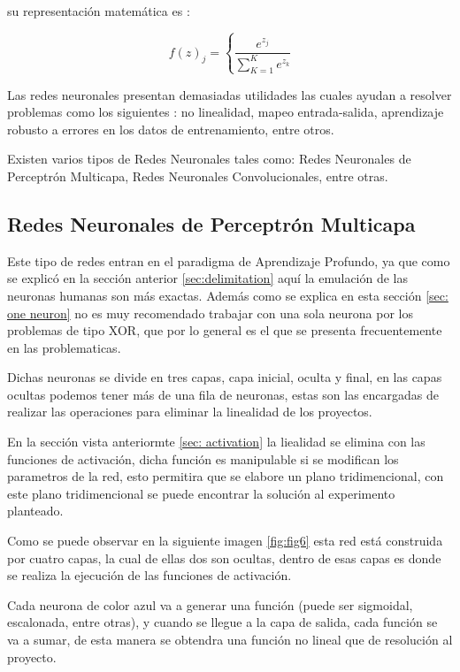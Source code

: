                 su representaci\'on matem\'atica es \cite{calvo-2018}:

                \[f(z)_j = \left\{ \frac{e^{z_j}}{\sum_{K=1}^{K} e^{z_k}} \right. \]

        Las redes neuronales presentan demasiadas utilidades las cuales ayudan a  resolver problemas como los 
        siguientes \cite{liu2015}: no linealidad, mapeo entrada-salida, aprendizaje robusto 
        a errores en los datos de entrenamiento, entre otros.

        Existen varios tipos de Redes Neuronales tales como: Redes Neuronales de Perceptr\'on 
        Multicapa, Redes Neuronales Convolucionales, entre otras.
    
        \subsection{Redes Neuronales de Perceptr\'on Multicapa}
            Este tipo de redes entran en el paradigma de Aprendizaje Profundo, ya que como se explic\'o en 
            la secci\'on anterior \eqref{sec:delimitation} aqu\'i la emulaci\'on de las neuronas humanas son m\'as 
            exactas.
            Adem\'as como se explica en esta sección \eqref{sec: one neuron} no es muy recomendado trabajar con una sola 
            neurona por los problemas de tipo XOR, que por lo general es el que se presenta frecuentemente en las problematicas.

            Dichas neuronas se divide en tres capas, capa inicial, oculta y final, en las capas ocultas podemos
            tener m\'as de una fila de neuronas, estas son las encargadas de realizar las operaciones para eliminar 
            la linealidad de los proyectos. 

            En la secci\'on vista anteriormte \eqref{sec: activation} la liealidad se elimina con las funciones de activaci\'on, dicha funci\'on 
            es manipulable si se modifican los parametros de la red, esto permitira que se elabore un plano tridimencional, con este plano tridimencional
            se puede encontrar la soluci\'on al experimento planteado.
            
            Como se puede observar en la siguiente imagen \eqref{fig:fig6} esta red est\'a
            construida por cuatro capas, la cual de ellas dos son ocultas, dentro de esas 
            capas es donde se realiza la ejecuci\'on de las funciones de activaci\'on.

            Cada neurona de color azul va a generar una funci\'on (puede ser sigmoidal, escalonada, entre otras), 
            y cuando se llegue a la capa de salida, cada funci\'on se va a sumar, de esta manera 
            se obtendra una funci\'on no lineal que de resoluci\'on al proyecto.

